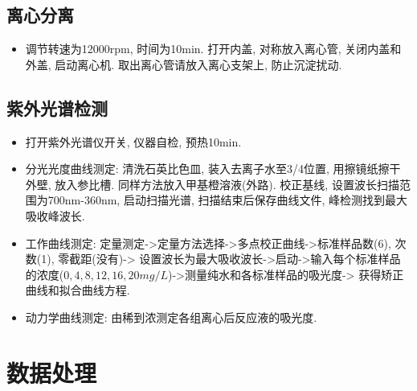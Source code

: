 \documentclass[a4paper]{article}
\begin{document}
\subsection{离心分离}
\begin{itemize}
	\item 调节转速为12000rpm, 时间为10min. 打开内盖, 对称放入离心管, 关闭内盖和外盖, 启动离心机.
	取出离心管请放入离心支架上, 防止沉淀扰动.
\end{itemize}
\subsection{紫外光谱检测}
\begin{itemize}
	\item 打开紫外光谱仪开关, 仪器自检, 预热10min.
	\item 分光光度曲线测定: 清洗石英比色皿, 装入去离子水至3/4位置, 用擦镜纸擦干外壁, 放入参比槽.
	同样方法放入甲基橙溶液(外路). 校正基线, 设置波长扫描范围为700nm-360nm, 启动扫描光谱, 扫描结束后保存曲线文件, 
	峰检测找到最大吸收峰波长.
	\item 工作曲线测定: 定量测定->定量方法选择->多点校正曲线->标准样品数(6), 次数(1), 零截距(没有)->
	设置波长为最大吸收波长->启动->输入每个标准样品的浓度($0, 4, 8, 12, 16, 20mg/L$)->测量纯水和各标准样品的吸光度->
	获得矫正曲线和拟合曲线方程.
	\item 动力学曲线测定: 由稀到浓测定各组离心后反应液的吸光度.
\end{itemize}

\newpage
\section{数据处理}
\end{document}
